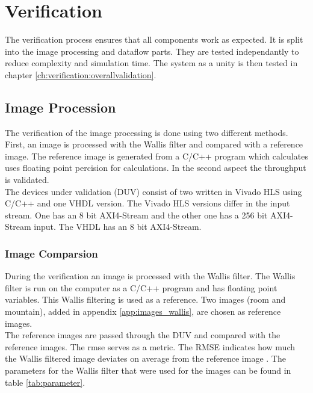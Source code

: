 %
%
\section{Verification} \label{ch:verification}
The verification process ensures that all components work as expected. It is
split into the image processing and dataflow parts. They are tested
independantly to reduce complexity and simulation time. The system as a unity is
then tested in chapter \ref{ch:verification:overallvalidation}.

%
%
\subsection{Image Procession}\label{ch:verification:imageprocessing}
The verification of the image processing is done using two different 
methods. First, an image is processed with the Wallis filter and compared 
with a reference image. The reference image is generated from a C/C++ program 
which calculates uses floating point percision for calculations. In the second
aspect the 
throughput is validated. \\
The devices under validation (DUV) consist of two written in Vivado HLS using
C/C++
and one VHDL version. The Vivado HLS versions differ in the input stream. One 
has an 8 bit AXI4-Stream and the other one has a 256 bit AXI4-Stream input. The
VHDL has an 8 bit AXI4-Stream.

\subsubsection*{Image Comparsion}
During the verification an image is processed with the Wallis filter. The Wallis
filter is run on the computer as a C/C++ program and has floating point
variables. This Wallis filtering is used as a reference. Two images (room and
mountain), added in appendix \ref{app:images_wallis}, are chosen as reference images. \\
The reference images are passed through the DUV and compared with the reference
images. The \gls{rmse} serves as a metric. The RMSE
indicates how much the  Wallis filtered image deviates on average from the
reference image \cite{rmse}. The parameters for the Wallis filter that were used
for the images can be found in table \ref{tab:parameter}.

